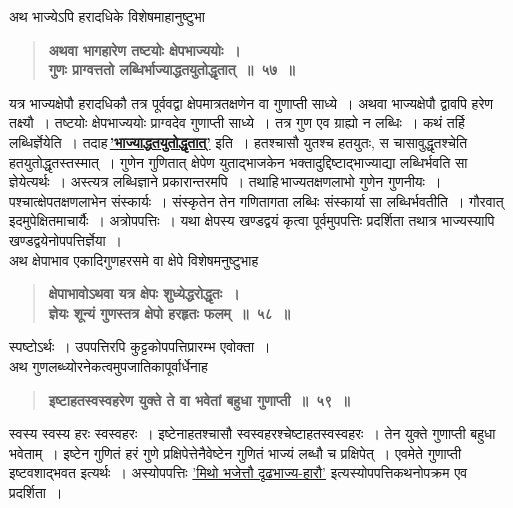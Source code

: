 \documentclass[11pt, openany]{book}
\begin{document}
\begin{sloppypar}
{\small अथ भाज्येऽपि हरादधिके विशेषमाहानुष्टुभा\textendash }

 \label{5.57}
\begin{quote}
{\large \textbf{{\color{purple}अथवा भागहारेण तष्टयोः क्षेपभाज्ययोः~।\\
गुणः प्राग्वत्ततो लब्धिर्भाज्याद्धतयुतोद्धृतात्~॥~५७~॥}}}
\end{quote}

यत्र भाज्यक्षेपौ हरादधिकौ तत्र पूर्ववद्वा क्षेपमात्रतक्षणेन वा गुणाप्ती साध्ये~। अथवा भाज्यक्षेपौ द्वावपि हरेण तक्ष्यौ~। तष्टयोः क्षेपभाज्ययोः प्राग्वदेव गुणाप्ती साध्ये~। तत्र गुण एव ग्राह्यो न लब्धिः~। कथं तर्हि लब्धिर्ज्ञेयेति~। तदाह\textendash \,\hyperref[5.57]{\textbf{'भाज्याद्धतयुतोद्धृतात्'}} इति~। हतश्चासौ युतश्च हतयुतः, स चासावुद्धृतश्चेति हतयुतोद्धृतस्तस्मात्~। गुणेन गुणितात् क्षेपेण युताद्भाजकेन भक्तादुद्दिष्टाद्भाज्याद्या लब्धिर्भवति सा ज्ञेयेत्यर्थः~। अस्त्यत्र लब्धिज्ञाने प्रकारान्तरमपि~। तथाहि\textendash \,भाज्यतक्षणलाभो गुणेन गुणनीयः~। पश्चात्क्षेपतक्षणलाभेन संस्कार्यः~। संस्कृतेन तेन गणितागता लब्धिः संस्कार्या सा लब्धिर्भवतीति~। गौरवात् इदमुपेक्षितमाचार्यैः~। अत्रोपपत्तिः~। यथा क्षेपस्य खण्डद्वयं कृत्वा पूर्वमुपपत्तिः प्रदर्शिता तथात्र भाज्यस्यापि खण्डद्वयेनोपपत्तिर्ज्ञेया~।\\

{\small अथ क्षेपाभाव एकादिगुणहरसमे वा क्षेपे विशेषमनुष्टुभाह\textendash }

 \label{5.58}
\begin{quote}
{\large \textbf{{\color{purple}क्षेपाभावोऽथवा यत्र क्षेपः शुध्येद्धरोद्धृतः~।\\
ज्ञेयः शून्यं गुणस्तत्र क्षेपो हरहृतः फलम्~॥~५८~॥}}}
\end{quote}

स्पष्टोऽर्थः~। उपपत्तिरपि कुट्टकोपपत्तिप्रारम्भ एवोक्ता~। \\

{\small अथ गुणलब्ध्योरनेकत्वमुपजातिकापूर्वार्धेनाह\textendash }

 \label{5.59}
\begin{quote}
{\large \textbf{{\color{purple}इष्टाहतस्वस्वहरेण युक्ते ते वा भवेतां बहुधा गुणाप्ती~॥~५९~॥}}}
\end{quote}

स्वस्य स्वस्य हरः स्वस्वहरः~। इष्टेनाहतश्चासौ स्वस्वहरश्चेष्टाहतस्वस्वहरः~। तेन युक्ते गुणाप्ती बहुधा भवेताम्~। इष्टेन गुणितं हरं गुणे प्रक्षिपेत्तेनैवेष्टेन गुणितं भाज्यं लब्धौ च प्रक्षिपेत्~। एवमेते गुणाप्ती इष्टवशाद्भवत इत्यर्थः~। अस्योपपत्तिः \hyperref[5.51]{'मिथो भजेत्तौ दृढभाज्य-हारौ'} इत्यस्योपपत्तिकथनोपक्रम एव प्रदर्शिता~।\\


\end{sloppypar}
\end{document}
